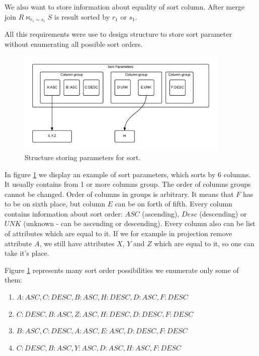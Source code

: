 We also want to store information about equality of sort column. After merge join $R\Join_{r_1=s_1} S$ is result sorted by $r_1$ or $s_1$.

All this requirements were use to design structure to store sort parameter without enumerating all possible sort orders.

\begin{figure}[h!]
  \centering
    \includegraphics[width=0.9\textwidth]{sortparameters}

      \caption{Structure storing parameters for sort.}
          \label{fig:sortparameters}
\end{figure}

In figure \ref{fig:sortparameters} we display an example of sort parameters, which sorts by 6 columns. It usually contains from 1 or more columns group. The order of columns groups cannot be changed. Order of columns in groups is arbitrary. It means that $F$ has to be on sixth place, but column $E$ can be on forth of fifth. Every column contains information about sort order: $ASC$ (ascending), $Desc$ (descending) or $UNK$ (unknown - can be ascending or descending). Every column also can be list of attributes which are equal to it. If we for example in projection remove attribute $A$, we still have attributes $X$, $Y$ and $Z$ which are equal to it, so one can take it's place.

Figure \ref{fig:sortparameters} represents many sort order possibilities we enumerate only some of them:
\begin{enumerate}
\item $A:ASC,C:DESC,B:ASC,H:DESC,D:ASC,F:DESC$
\item $C:DESC,B:ASC,Z:ASC,H:DESC,D:DESC,F:DESC$
\item $B:ASC,C:DESC,A:ASC,E:ASC,D:DESC,F:DESC$
\item $C:DESC,B:ASC,Y:ASC,D:ASC,H:ASC,F:DESC$
\end{enumerate}



